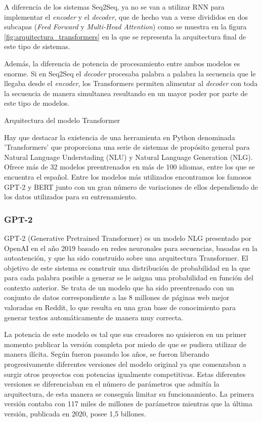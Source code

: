A diferencia de los sistemas Seq2Seq, ya no se van a utilizar RNN para implementar el \textit{encoder} y el \textit{decoder}, que de hecho van a verse divididos en dos subcapas (\textit{Feed Forward} y \textit{Multi-Head Attention}) como se muestra en la figura \ref{fig:arquitectura_transformers} en la que se representa la arquitectura final de este tipo de sistemas.

Además, la diferencia de potencia de procesamiento entre ambos modelos es enorme. Si en Seq2Seq el \textit{decoder} procesaba palabra a palabra la secuencia que le llegaba desde el \textit{encoder}, los Transformers permiten alimentar al \textit{decoder} con toda la secuencia de manera simultanea resultando en un mayor poder por parte de este tipo de modelos.

%
{Arquitectura del modelo Transformer}

Hay que destacar la existencia de una herramienta en Python denominada 'Transformers' que proporciona una serie de sistemas de propósito general para Natural Language Understading (NLU) y Natural Language Generation (NLG). Ofrece más de 32 modelos preentrenados en más de 100 idiomas, entre los que se encuentra el español. Entre los modelos más utilizados encontramos los famosos GPT-2 y BERT junto con un gran número de variaciones de ellos dependiendo de los datos utilizados para su entrenamiento.

\subsubsection{GPT-2}
GPT-2 (Generative Pretrained Transformer) es un modelo NLG presentado por OpenAI en el año 2019 basado en redes neuronales para secuencias, basadas en la autoatención, y que ha sido construido sobre una arquitectura Transformer. El objetivo de este sistema es construir una distribución de probabilidad en la que para cada palabra posible a generar se le asigna una probabilidad en función del contexto anterior. Se trata de un modelo que ha sido preentrenado con un conjunto de datos correspondiente a las 8 millones de páginas web mejor valoradas en Reddit, lo que resulta en una gran base de conocimiento para generar textos automáticamente de manera muy correcta.

La potencia de este modelo es tal que sus creadores no quisieron en un primer momento publicar la versión completa por miedo de que se pudiera utilizar de manera ilícita. Según fueron pasando los años, se fueron liberando progresivamente diferentes versiones del modelo original ya que comenzaban a surgir otros proyectos con potencias igualmente competitivas. Estas diferentes versiones se diferenciaban en el número de parámetros que admitía la arquitectura, de esta manera se conseguía limitar su funcionamiento. La primera versión contaba con 117 miles de millones de parámetros mientras que la última versión, publicada en 2020, posee 1,5 billones.

